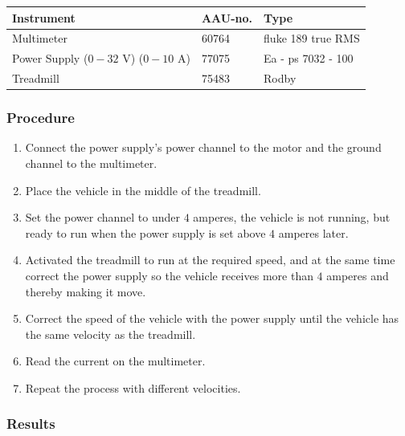 \begin{table}[H]
\begin{tabular}{|l|l|p{4cm}|}
\hline%
  \textbf{Instrument}                        &  \textbf{AAU-no.}  &  \textbf{Type}       \\
\hline%
  Multimeter                               &  60764             &  fluke 189 true RMS    \\
\hline%
  Power Supply ($0 - 32$ V) ($0 - 10$ A)     &  77075             &  Ea - ps 7032 - 100  \\
\hline%
  Treadmill                         &  75483             &  Rodby            \\
\hline%
\end{tabular}
\end{table}

\subsubsection{Procedure}

\begin{enumerate}
  \item Connect the power supply's power channel to the motor and the ground channel to the multimeter.
  \item Place the vehicle in the middle of the treadmill.
  \item Set the power channel to under $4$ amperes, the vehicle is not running, but ready to run when the power supply is set above $4$ amperes later. 
  \item Activated the treadmill to run at the required speed, and at the same time correct the power supply so the vehicle receives more than $4$ amperes and thereby making it move.
  \item Correct the speed of the vehicle with the power supply until the vehicle has the same velocity as the treadmill.
  \item Read the current on the multimeter.
  \item Repeat the process with different velocities.
\end{enumerate}

\subsubsection{Results}

